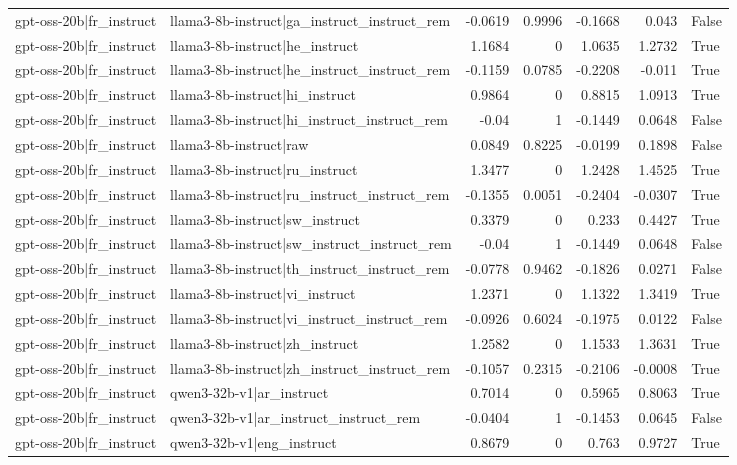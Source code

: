 \begin{table}
\begin{tabular}{l l r r r r l}
gpt-oss-20b|fr_instruct & llama3-8b-instruct|ga_instruct_instruct_rem & -0.0619 & 0.9996 & -0.1668 & 0.043 & False \\
gpt-oss-20b|fr_instruct & llama3-8b-instruct|he_instruct & 1.1684 & 0 & 1.0635 & 1.2732 & True \\
gpt-oss-20b|fr_instruct & llama3-8b-instruct|he_instruct_instruct_rem & -0.1159 & 0.0785 & -0.2208 & -0.011 & True \\
gpt-oss-20b|fr_instruct & llama3-8b-instruct|hi_instruct & 0.9864 & 0 & 0.8815 & 1.0913 & True \\
gpt-oss-20b|fr_instruct & llama3-8b-instruct|hi_instruct_instruct_rem & -0.04 & 1 & -0.1449 & 0.0648 & False \\
gpt-oss-20b|fr_instruct & llama3-8b-instruct|raw & 0.0849 & 0.8225 & -0.0199 & 0.1898 & False \\
gpt-oss-20b|fr_instruct & llama3-8b-instruct|ru_instruct & 1.3477 & 0 & 1.2428 & 1.4525 & True \\
gpt-oss-20b|fr_instruct & llama3-8b-instruct|ru_instruct_instruct_rem & -0.1355 & 0.0051 & -0.2404 & -0.0307 & True \\
gpt-oss-20b|fr_instruct & llama3-8b-instruct|sw_instruct & 0.3379 & 0 & 0.233 & 0.4427 & True \\
gpt-oss-20b|fr_instruct & llama3-8b-instruct|sw_instruct_instruct_rem & -0.04 & 1 & -0.1449 & 0.0648 & False \\
gpt-oss-20b|fr_instruct & llama3-8b-instruct|th_instruct_instruct_rem & -0.0778 & 0.9462 & -0.1826 & 0.0271 & False \\
gpt-oss-20b|fr_instruct & llama3-8b-instruct|vi_instruct & 1.2371 & 0 & 1.1322 & 1.3419 & True \\
gpt-oss-20b|fr_instruct & llama3-8b-instruct|vi_instruct_instruct_rem & -0.0926 & 0.6024 & -0.1975 & 0.0122 & False \\
gpt-oss-20b|fr_instruct & llama3-8b-instruct|zh_instruct & 1.2582 & 0 & 1.1533 & 1.3631 & True \\
gpt-oss-20b|fr_instruct & llama3-8b-instruct|zh_instruct_instruct_rem & -0.1057 & 0.2315 & -0.2106 & -0.0008 & True \\
gpt-oss-20b|fr_instruct & qwen3-32b-v1|ar_instruct & 0.7014 & 0 & 0.5965 & 0.8063 & True \\
gpt-oss-20b|fr_instruct & qwen3-32b-v1|ar_instruct_instruct_rem & -0.0404 & 1 & -0.1453 & 0.0645 & False \\
gpt-oss-20b|fr_instruct & qwen3-32b-v1|eng_instruct & 0.8679 & 0 & 0.763 & 0.9727 & True \\

\end{tabular}
\end{table}
